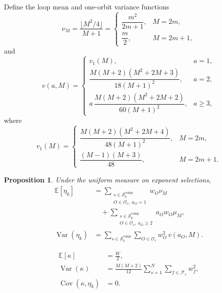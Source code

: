 \documentclass[preprint,12pt,a4paper]{elsarticle}
\newcommand{\Fs}{\mathcal F_s}
\newcommand{\Os}{\mathcal O_s}
\newtheorem{proposition}[theorem]{Proposition}
\theoremstyle{definition}
\theoremstyle{remark}
\begin{document}
Define the loop mean and one-orbit variance functions
\[
\nu_M=\frac{\lfloor M^2/4\rfloor}{M+1}
 =\begin{cases}
   \dfrac{m^2}{2m+1},&M=2m,\\[4pt] \dfrac{m}{2},&M=2m+1,
  \end{cases}
\]
and
{\small
\[
v(a,M)=
\begin{cases}
v_1(M), & a=1,\\[2pt]
\dfrac{M(M+2)(M^2+2M+3)}{18(M+1)^2}, & a=2,\\[6pt]
a\,\dfrac{M(M+2)(M^2+2M+2)}{60(M+1)^2}, & a\geq3,
\end{cases}
\]
}
where
{\small
\[
v_1(M)=
\begin{cases}
\dfrac{M(M+2)(M^2+2M+4)}{48(M+1)^2},&M=2m,\\[6pt]
\dfrac{(M-1)(M+3)}{48},&M=2m+1.
\end{cases}
\]
}

\begin{proposition}\label{prop:moments}
Under the uniform measure on exponent selections,
{\small
\[
\begin{aligned}
\mathbb{E}[\eta_k]
&=
\sum_{\substack{s\in\mathcal{S}_k^{\mathrm{comp}}\\[-2pt]
O\in\Os,\ a_O=1}}
w_O\nu_M\\
&\quad+
\sum_{\substack{s\in\mathcal{S}_k^{\mathrm{comp}}\\[-2pt]
O\in\Os,\ a_O\geq2}}
a_Ow_O\mu_M,\\[4pt]
\operatorname{Var}(\eta_k)
&=
\sum_{s\in\mathcal{S}_k^{\mathrm{comp}}}
\sum_{O\in\Os}
w_O^2\,v(a_O,M).
\end{aligned}
\]
}

{\small
\[
\begin{aligned}
\mathbb{E}[\kappa]
&=\frac{W}{2},\\[3pt]
\operatorname{Var}(\kappa)
&=\frac{M(M+2)}{12}
\sum_{s=1}^{N}\sum_{f\in\Fs}w_f^2,\\[3pt]
\operatorname{Cov}(\kappa,\eta_k)
&=0.
\end{aligned}
\]
}
\end{proposition}
\end{document}
